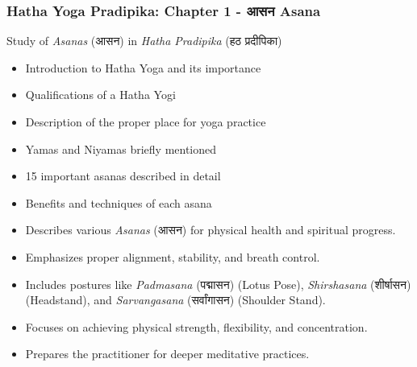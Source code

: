\begin{frame}[fragile]\frametitle{Hatha Yoga Pradipika: Chapter 1 - आसन  Asana}

Study of \textit{Asanas} (आसन) in \textit{Hatha Pradipika} (हठ प्रदीपिका)

\begin{itemize}
    \item Introduction to Hatha Yoga and its importance
    \item Qualifications of a Hatha Yogi
    \item Description of the proper place for yoga practice
    \item Yamas and Niyamas briefly mentioned
    \item 15 important asanas described in detail
    \item Benefits and techniques of each asana
	\item Describes various \textit{Asanas} (आसन) for physical health and spiritual progress.
	\item Emphasizes proper alignment, stability, and breath control.
	\item Includes postures like \textit{Padmasana} (पद्मासन) (Lotus Pose), \textit{Shirshasana} (शीर्षासन) (Headstand), and \textit{Sarvangasana} (सर्वांगासन) (Shoulder Stand).
	\item Focuses on achieving physical strength, flexibility, and concentration.
	\item Prepares the practitioner for deeper meditative practices.
  \end{itemize}

\end{frame}


